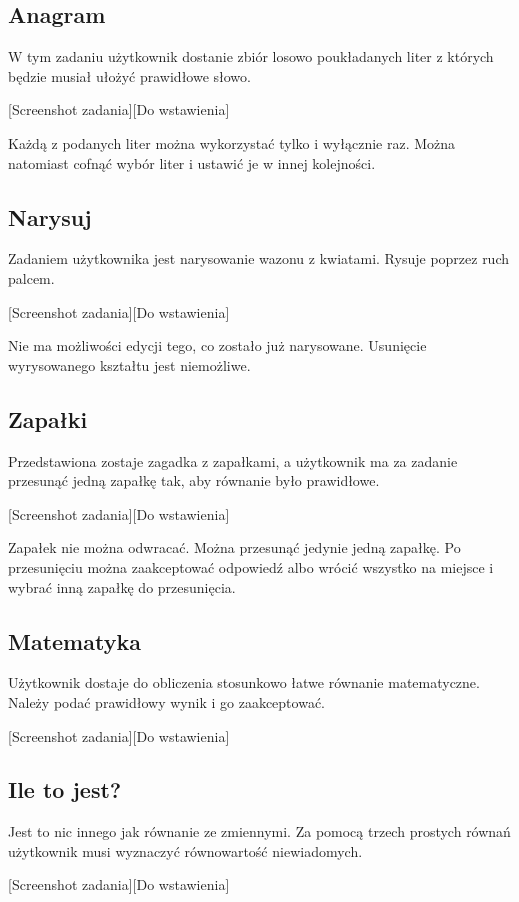 \documentclass[openright]{xmgr}
\begin{document}
\subsection{Anagram}
W tym zadaniu użytkownik dostanie zbiór losowo poukładanych liter z których będzie musiał ułożyć prawidłowe słowo.

[Screenshot zadania][Do wstawienia]

Każdą z podanych liter można wykorzystać tylko i wyłącznie raz. Można natomiast cofnąć wybór liter i ustawić je w innej kolejności.

\subsection{Narysuj}
Zadaniem użytkownika jest narysowanie wazonu z kwiatami. Rysuje poprzez ruch palcem.

[Screenshot zadania][Do wstawienia]

Nie ma możliwości edycji tego, co zostało już narysowane. Usunięcie wyrysowanego kształtu jest niemożliwe.

\subsection{Zapałki}
Przedstawiona zostaje zagadka z zapałkami, a użytkownik ma za zadanie przesunąć jedną zapałkę tak, aby równanie było prawidłowe.

[Screenshot zadania][Do wstawienia]

Zapałek nie można odwracać. Można przesunąć jedynie jedną zapałkę. Po przesunięciu można zaakceptować odpowiedź albo wrócić wszystko na miejsce i wybrać inną zapałkę do przesunięcia.

\subsection{Matematyka}
Użytkownik dostaje do obliczenia stosunkowo łatwe równanie matematyczne. Należy podać prawidłowy wynik i go zaakceptować.

[Screenshot zadania][Do wstawienia]


\subsection{Ile to jest?}
Jest to nic innego jak równanie ze zmiennymi. Za pomocą trzech prostych równań użytkownik musi wyznaczyć równowartość niewiadomych.

[Screenshot zadania][Do wstawienia]
\end{document}
